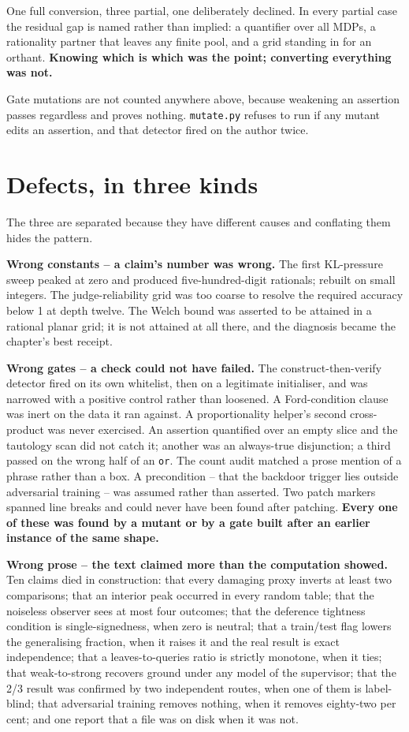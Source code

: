 One full conversion, three partial, one deliberately declined. In every partial case the residual gap is named rather than implied: a quantifier over all MDPs, a rationality partner that leaves any finite pool, and a grid standing in for an orthant. \textbf{Knowing which is which was the point; converting everything was not.}

Gate mutations are not counted anywhere above, because weakening an assertion passes regardless and proves nothing. \texttt{mutate.py} refuses to run if any mutant edits an assertion, and that detector fired on the author twice.

\section*{Defects, in three kinds}

The three are separated because they have different causes and conflating them hides the pattern.

\textbf{Wrong constants -- a claim's number was wrong.} The first KL-pressure sweep peaked at zero and produced five-hundred-digit rationals; rebuilt on small integers. The judge-reliability grid was too coarse to resolve the required accuracy below 1 at depth twelve. The Welch bound was asserted to be attained in a rational planar grid; it is not attained at all there, and the diagnosis became the chapter's best receipt.

\textbf{Wrong gates -- a check could not have failed.} The construct-then-verify detector fired on its own whitelist, then on a legitimate initialiser, and was narrowed with a positive control rather than loosened. A Ford-condition clause was inert on the data it ran against. A proportionality helper's second cross-product was never exercised. An assertion quantified over an empty slice and the tautology scan did not catch it; another was an always-true disjunction; a third passed on the wrong half of an \texttt{or}. The count audit matched a prose mention of a phrase rather than a box. A precondition -- that the backdoor trigger lies outside adversarial training -- was assumed rather than asserted. Two patch markers spanned line breaks and could never have been found after patching. \textbf{Every one of these was found by a mutant or by a gate built after an earlier instance of the same shape.}

\textbf{Wrong prose -- the text claimed more than the computation showed.} Ten claims died in construction: that every damaging proxy inverts at least two comparisons; that an interior peak occurred in every random table; that the noiseless observer sees at most four outcomes; that the deference tightness condition is single-signedness, when zero is neutral; that a train/test flag lowers the generalising fraction, when it raises it and the real result is exact independence; that a leaves-to-queries ratio is strictly monotone, when it ties; that weak-to-strong recovers ground under any model of the supervisor; that the 2/3 result was confirmed by two independent routes, when one of them is label-blind; that adversarial training removes nothing, when it removes eighty-two per cent; and one report that a file was on disk when it was not.

